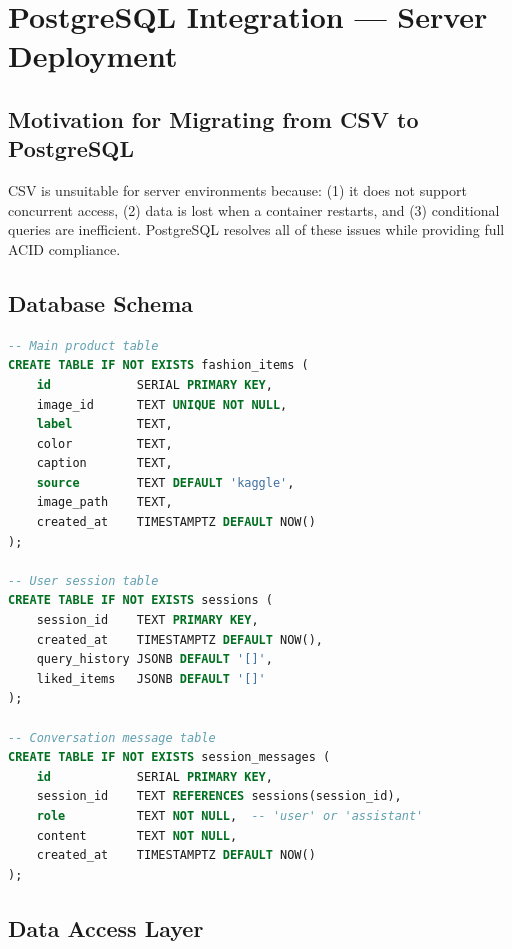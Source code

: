 \documentclass[12pt, twoside]{report}
\begin{document}
\chapter{PostgreSQL Integration --- Server Deployment}

\section{Motivation for Migrating from CSV to PostgreSQL}
\begin{tcolorbox}[title=Note]
CSV is unsuitable for server environments because: (1) it does not support concurrent access, (2) data is lost when a container restarts, and (3) conditional queries are inefficient. PostgreSQL resolves all of these issues while providing full ACID compliance.
\end{tcolorbox}

\section{Database Schema}

\begin{lstlisting}[language=sql,caption={PostgreSQL schema for the Fashion Agent}]
-- Main product table
CREATE TABLE IF NOT EXISTS fashion_items (
    id            SERIAL PRIMARY KEY,
    image_id      TEXT UNIQUE NOT NULL,
    label         TEXT,
    color         TEXT,
    caption       TEXT,
    source        TEXT DEFAULT 'kaggle',
    image_path    TEXT,
    created_at    TIMESTAMPTZ DEFAULT NOW()
);

-- User session table
CREATE TABLE IF NOT EXISTS sessions (
    session_id    TEXT PRIMARY KEY,
    created_at    TIMESTAMPTZ DEFAULT NOW(),
    query_history JSONB DEFAULT '[]',
    liked_items   JSONB DEFAULT '[]'
);

-- Conversation message table
CREATE TABLE IF NOT EXISTS session_messages (
    id            SERIAL PRIMARY KEY,
    session_id    TEXT REFERENCES sessions(session_id),
    role          TEXT NOT NULL,  -- 'user' or 'assistant'
    content       TEXT NOT NULL,
    created_at    TIMESTAMPTZ DEFAULT NOW()
);
\end{lstlisting}

\section{Data Access Layer}
\end{document}

